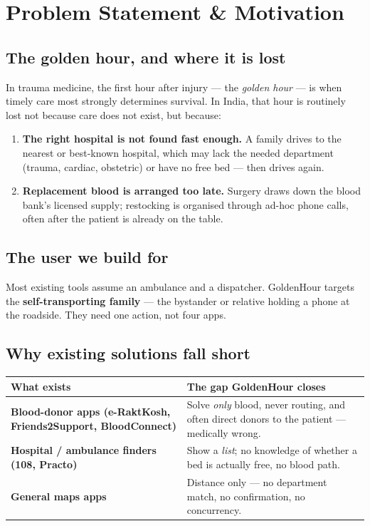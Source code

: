 \documentclass[11pt]{article}
\begin{document}
\section{Problem Statement \& Motivation}

\subsection{The golden hour, and where it is lost}
In trauma medicine, the first hour after injury --- the \emph{golden hour} --- is
when timely care most strongly determines survival. In India, that hour is
routinely lost not because care does not exist, but because:

\begin{enumerate}[leftmargin=1.6em]
  \item \textbf{The right hospital is not found fast enough.} A family drives to the
  nearest or best-known hospital, which may lack the needed department (trauma,
  cardiac, obstetric) or have no free bed --- then drives again.
  \item \textbf{Replacement blood is arranged too late.} Surgery draws down the blood
  bank's licensed supply; restocking is organised through ad-hoc phone calls,
  often after the patient is already on the table.
\end{enumerate}

\subsection{The user we build for}
Most existing tools assume an ambulance and a dispatcher. GoldenHour targets the
\textbf{self-transporting family} --- the bystander or relative holding a phone at
the roadside. They need one action, not four apps.

\subsection{Why existing solutions fall short}
\begin{center}
\begin{tabularx}{\textwidth}{@{}>{\bfseries}p{4.6cm} L@{}}
\toprule
\textbf{What exists} & \textbf{The gap GoldenHour closes} \\
\midrule
Blood-donor apps (e-RaktKosh, Friends2Support, BloodConnect) & Solve \emph{only} blood, never routing, and often direct donors to the patient --- medically wrong. \\
Hospital / ambulance finders (108, Practo) & Show a \emph{list}; no knowledge of whether a bed is actually free, no blood path. \\
General maps apps & Distance only --- no department match, no confirmation, no concurrency. \\
\bottomrule
\end{tabularx}
\end{center}
\end{document}
